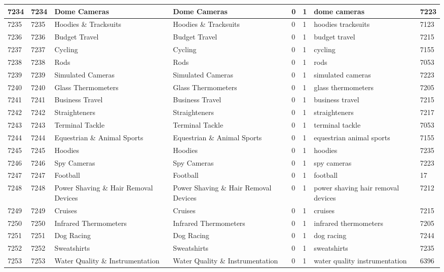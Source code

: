 \begin{longtable}{|l|l|l|l|l|l|l|l|}
7234 & 7234 & Dome Cameras & Dome Cameras & 0 & 1 & dome cameras & 7223 \\ \hline 
7235 & 7235 & Hoodies \& Tracksuits & Hoodies \& Tracksuits & 0 & 1 & hoodies tracksuits & 7123 \\ \hline 
7236 & 7236 & Budget Travel & Budget Travel & 0 & 1 & budget travel & 7215 \\ \hline 
7237 & 7237 & Cycling & Cycling & 0 & 1 & cycling & 7155 \\ \hline 
7238 & 7238 & Rods & Rods & 0 & 1 & rods & 7053 \\ \hline 
7239 & 7239 & Simulated Cameras & Simulated Cameras & 0 & 1 & simulated cameras & 7223 \\ \hline 
7240 & 7240 & Glass Thermometers & Glass Thermometers & 0 & 1 & glass thermometers & 7205 \\ \hline 
7241 & 7241 & Business Travel & Business Travel & 0 & 1 & business travel & 7215 \\ \hline 
7242 & 7242 & Straighteners & Straighteners & 0 & 1 & straighteners & 7217 \\ \hline 
7243 & 7243 & Terminal Tackle & Terminal Tackle & 0 & 1 & terminal tackle & 7053 \\ \hline 
7244 & 7244 & Equestrian \& Animal Sports & Equestrian \& Animal Sports & 0 & 1 & equestrian animal sports & 7155 \\ \hline 
7245 & 7245 & Hoodies & Hoodies & 0 & 1 & hoodies & 7235 \\ \hline 
7246 & 7246 & Spy Cameras & Spy Cameras & 0 & 1 & spy cameras & 7223 \\ \hline 
7247 & 7247 & Football & Football & 0 & 1 & football & 17 \\ \hline 
7248 & 7248 & Power Shaving \& Hair Removal Devices & Power Shaving \& Hair Removal Devices & 0 & 1 & power shaving hair removal devices & 7212 \\ \hline 
7249 & 7249 & Cruises & Cruises & 0 & 1 & cruises & 7215 \\ \hline 
7250 & 7250 & Infrared Thermometers & Infrared Thermometers & 0 & 1 & infrared thermometers & 7205 \\ \hline 
7251 & 7251 & Dog Racing & Dog Racing & 0 & 1 & dog racing & 7244 \\ \hline 
7252 & 7252 & Sweatshirts & Sweatshirts & 0 & 1 & sweatshirts & 7235 \\ \hline 
7253 & 7253 & Water Quality \& Instrumentation & Water Quality \& Instrumentation & 0 & 1 & water quality instrumentation & 6396 \\ \hline 

\end{longtable}
